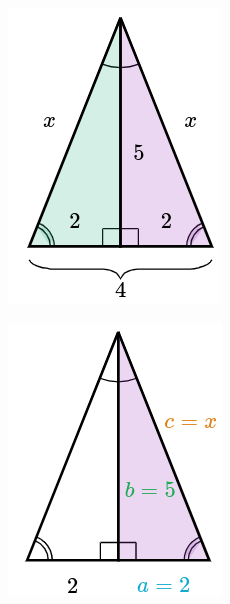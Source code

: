 \begin{solutionbox}{14cm}
    \begin{minipage}{0.3\textwidth}
        \begin{figure}[H]
            \centering
            \includegraphics[width=0.6\linewidth]{../images/pitagoras8a.png}
            \caption{}
            \label{fig:pitagoras8a}
        \end{figure}
        \begin{figure}[H]
            \centering
            \includegraphics[width=0.6\linewidth]{../images/pitagoras8b.png}
            \caption{}
            \label{fig:pitagoras8b}

\end{figure}
\end{minipage}
\end{solutionbox}
